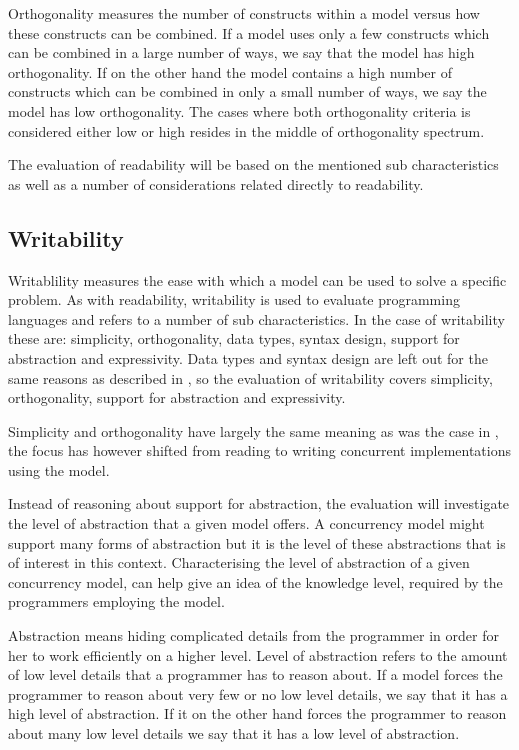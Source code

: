 Orthogonality measures the number of constructs within a model versus how these constructs can be combined\cite[p. 9]{sebestaProLang}. If a model uses only a few constructs which can be combined in a large number of ways, we say that the model has high orthogonality. If on the other hand the model contains a high number of constructs which can be combined in only a small number of ways, we say the model has low orthogonality. The cases where both orthogonality criteria is considered either low or high resides in the middle of orthogonality spectrum.

The evaluation of readability will be based on the mentioned sub characteristics as well as a number of considerations related directly to readability.

\subsection{Writability}\label{sec:writablity}
Writablility measures the ease with which a model can be used to solve a specific problem\cite[p. 13]{sebestaProLang}. As with readability, writability is used to evaluate programming languages and refers to a number of sub characteristics. In the case of writability these are: simplicity, orthogonality, data types, syntax design, support for abstraction and expressivity. Data types and syntax design are left out for the same reasons as described in , so the evaluation of writability covers simplicity, orthogonality, support for abstraction and expressivity. 

Simplicity and orthogonality have largely the same meaning as was the case in , the focus has however shifted from reading to writing concurrent implementations using the model. 

Instead of reasoning about support for abstraction, the evaluation will investigate the level of abstraction that a given model offers. A concurrency model might support many forms of abstraction but it is the level of these abstractions that is of interest in this context. Characterising the level of abstraction of a given concurrency model, can help give an idea of the knowledge level, required by the programmers employing the model.

Abstraction means hiding complicated details from the programmer in order for her to work efficiently on a higher level\cite[p. 14]{sebestaProLang}. Level of abstraction refers to the amount of low level details that a programmer has to reason about. If a model forces the programmer to reason about very few or no low level details, we say that it has a high level of abstraction. If it on the other hand forces the programmer to reason about many low level details we say that it has a low level of abstraction.

